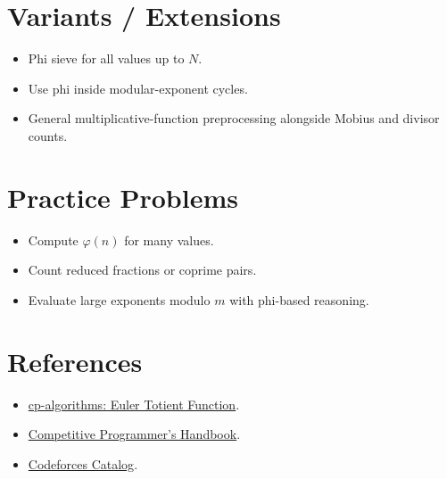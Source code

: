 \section*{Variants / Extensions}

\begin{itemize}
  \item Phi sieve for all values up to \(N\).
  \item Use phi inside modular-exponent cycles.
  \item General multiplicative-function preprocessing alongside Mobius and divisor counts.
\end{itemize}

\section*{Practice Problems}

\begin{itemize}
  \item Compute \(\varphi(n)\) for many values.
  \item Count reduced fractions or coprime pairs.
  \item Evaluate large exponents modulo \(m\) with phi-based reasoning.
\end{itemize}

\section*{References}

\begin{itemize}
  \item \href{https://cp-algorithms.com/algebra/phi-function.html}{cp-algorithms: Euler Totient Function}.
  \item \href{https://usaco.guide/CPH.pdf}{Competitive Programmer's Handbook}.
  \item \href{https://codeforces.com/catalog?locale=en}{Codeforces Catalog}.
\end{itemize}
